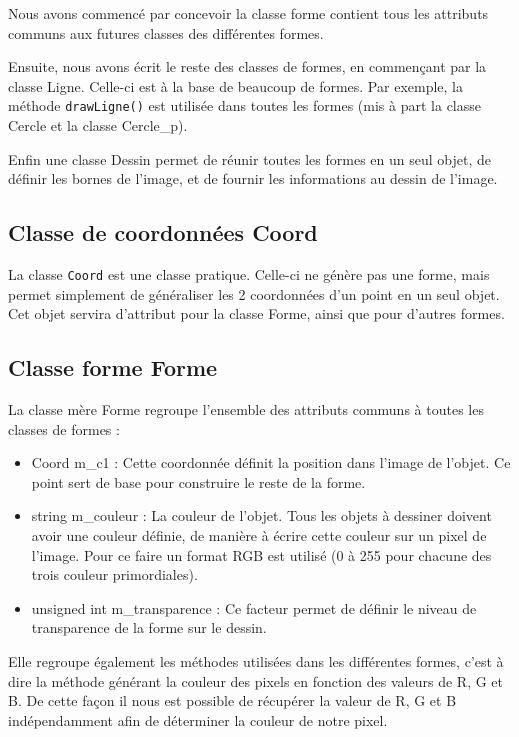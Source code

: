 \documentclass[11pt]{article}
\begin{document}
Nous avons commencé par concevoir la classe forme contient tous les attributs communs aux futures classes des différentes formes. 

Ensuite, nous avons écrit le reste des classes de formes, en commençant par la classe Ligne. Celle-ci est à la base de beaucoup de formes. Par exemple, la méthode \texttt{drawLigne()} est utilisée dans toutes les formes (mis à part la classe Cercle et la classe Cercle\_p).

Enfin une classe Dessin permet de réunir toutes les formes en un seul objet, de définir les bornes de l'image, et de fournir les informations au dessin de l'image. 

\subsection{Classe de coordonnées Coord}

La classe \texttt{Coord} est une classe pratique. Celle-ci ne génère pas une forme, mais permet simplement de généraliser les 2 coordonnées d'un point en un seul objet. Cet objet servira d'attribut pour la classe Forme, ainsi que pour d'autres formes. 

\subsection{Classe forme Forme}

La classe mère Forme regroupe l'ensemble des attributs communs à toutes les classes de formes :

\begin{itemize}
    \item Coord m\_c1 : Cette coordonnée définit la position dans l'image de l'objet. Ce point sert de base pour construire le reste de la forme. 
    \item string m\_couleur : La couleur de l'objet. Tous les objets à dessiner doivent avoir une couleur définie, de manière à écrire cette couleur sur un pixel de l'image. Pour ce faire un format RGB est utilisé (0 à 255 pour chacune des trois couleur primordiales). 
    \item unsigned int m\_transparence : Ce facteur permet de définir le niveau de transparence de la forme sur le dessin.\\ 
\end{itemize}

Elle regroupe également les méthodes utilisées dans les différentes formes, c'est à dire la méthode générant la couleur des pixels en fonction des valeurs de R, G et B. De cette façon il nous est possible de récupérer la valeur de R, G et B indépendamment afin de déterminer la couleur de notre pixel. 
\end{document}
